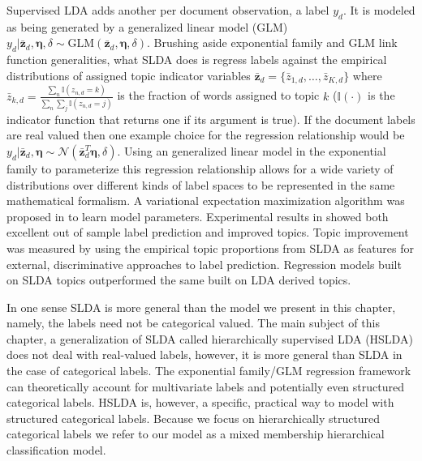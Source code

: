 Supervised LDA adds another per document observation, a label $y_d$.  It is modeled as being generated by a generalized linear model (GLM) $y_d | \bar{{\mathbf z}}_d, \boldsymbol\eta,\delta \sim \mathrm{GLM}(\bar{\mathbf{z}}_d,\boldsymbol\eta,\delta)$.  Brushing aside exponential family and GLM link function generalities, what SLDA does is regress labels against the empirical distributions of assigned topic indicator variables $\bar{\mathbf{z}}_d = \{\bar{z}_{1,d}, \ldots, \bar{z}_{K,d}\}$ where $\bar{z}_{k,d} = \frac{\sum_n \mathbb{I}(z_{n,d}=k)}{\sum_n \sum_j \mathbb{I}(z_{n,d}=j)}$ is the fraction of words assigned to topic $k$ ($\mathbb{I}(\cdot)$ is the indicator function that returns one if its argument is true).
If the document labels are real valued then one example choice for the regression relationship would be $y_d | {\bar{\mathbf z}}_d, \boldsymbol\eta \sim \mathcal{N}(\bar{\mathbf{z}}_d^T\boldsymbol\eta,\delta).$  Using an generalized linear model in the exponential family to parameterize this regression relationship allows for a wide variety of distributions over different kinds of label spaces to be represented in the same mathematical formalism.   A variational expectation maximization algorithm was proposed in \cite{BleiMcAuliffe2008} to learn model parameters.  Experimental results in \cite{BleiMcAuliffe2008}  showed both excellent out of sample label prediction and improved topics.  Topic improvement was measured by using the empirical topic proportions from SLDA  as features for external, discriminative approaches to label prediction.  Regression models built on SLDA topics outperformed the same built on LDA derived topics.

In one sense SLDA is more general than the model we present in this chapter, namely, the labels need not be categorical valued.  %
The main subject of this chapter, a generalization of SLDA called hierarchically supervised LDA (HSLDA) \cite{Perotte-2012-NIPS} does not deal with real-valued labels, however, it is more general than SLDA in the case of categorical labels.  The exponential family/GLM regression framework can theoretically account for multivariate labels and potentially even structured categorical labels.   HSLDA is, however,  a specific, practical way to model with structured categorical labels.  Because we focus on hierarchically structured categorical labels we refer to our model as a mixed membership hierarchical classification model. 


